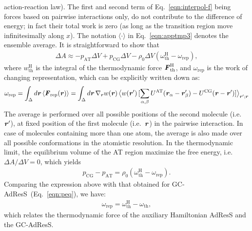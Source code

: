 \documentclass[a4paper,preprint,unsortedaddress]{revtex4-1}
\newcommand{\vect}[1]{\textbf{\textit{#1}}}
\newcommand{\AT}{{\textrm{{AT}}}}
\newcommand{\CG}{{\textrm{CG}}}
\newcommand{\HY}{{\Delta}}
\newcommand{\thf}{{\textrm{th}}}
\newcommand{\res}{{\textrm{rep}}}
\newcommand{\hadress}{{\textrm{H}}}
\begin{document}
{action-reaction law). The first and second term of Eq.~\eqref{eqn:interpol-f}
being forces based on pairwise interactions only, do not contribute to the difference of energy; in fact 
their total work is zero (as long as the transition region move infinitesimally along $x$).
The notation $\langle\cdot\rangle$ in Eq.~\eqref{eqn:apptmp3} denotes the ensemble average.
It is straightforward to show that
\begin{align}\label{eqn:peq-d}
  \Delta A \approx
  -p_\AT\Delta V + p_\CG\Delta V -
  \rho_0 \Delta V (\omega_\thf^\hadress - \omega_\res), 
\end{align}
where $w_\thf^\hadress$ is the integral of the 
thermodynamic force $\vect F_\thf^\hadress$, and
$ \omega_\res$ is the work of changing representation,
which can be explicitly written down as:
\begin{align}\label{eqn:w-rep}
  \omega_\res
  = \int_\HY d \vect r\,\langle \vect F_\res (\vect r)\rangle
  = \int_\HY d \vect r\,\nabla_{\vect r}w(\vect r)\,
  \big\langle w(\vect r')\,
  [\sum_{\alpha,\beta}U^\AT(\vect r_\alpha-\vect r'_\beta) - U^\CG(\vect r-\vect r')]\big\rangle_{\vect r'; \vect r}
\end{align}
The average is performed over all
  possible positions of the second molecule (i.e.~$\vect r'$),
  at fixed position of the first molecule (i.e.~$\vect r$) 
  in the pairwise interaction.
In case of molecules containing
more than one atom, the average is also made over all possible
conformations in the atomistic resolution.
In the thermodynamic limit, the equilibrium volume of the AT region maximize the
free energy, i.e.~$\Delta A / \Delta V
= 0$, which yields
\begin{align}\label{eqn:peq-h}
  p_\CG - p_\AT =  \rho_0 (\omega_\thf^\hadress - \omega_\res).
\end{align}
Comparing the expression above with that obtained for GC-AdResS~(Eq.~\eqref{eqn:peq}),
we have: 
\begin{align}\label{eqn:hd-rel}
  \omega_\res = \omega_\thf^\hadress -   \omega_\thf,
\end{align}
which relates the thermodynamic force of the auxiliary Hamiltonian AdResS
and the GC-AdResS.\\

}
\end{document}
